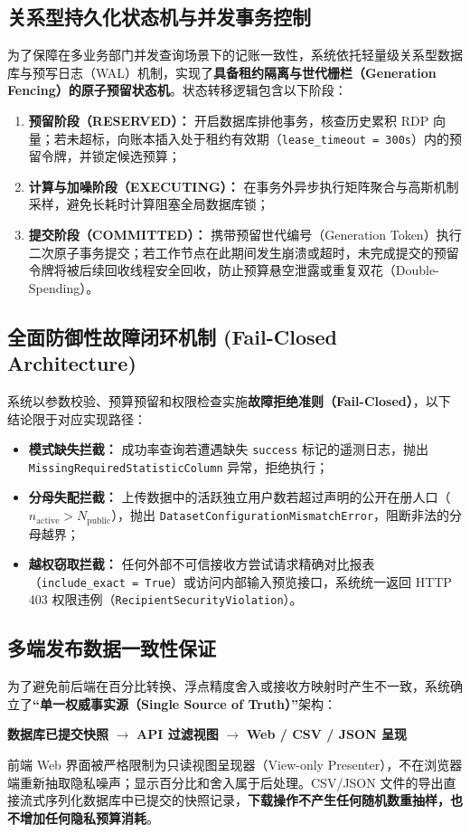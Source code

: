 \subsection{关系型持久化状态机与并发事务控制}
为了保障在多业务部门并发查询场景下的记账一致性，系统依托轻量级关系型数据库与预写日志（WAL）机制，实现了\textbf{具备租约隔离与世代栅栏（Generation Fencing）的原子预留状态机}。状态转移逻辑包含以下阶段：
\begin{enumerate}[label=(\alph*), leftmargin=2.5em]
  \item \textbf{预留阶段（RESERVED）：} 开启数据库排他事务，核查历史累积 RDP 向量；若未超标，向账本插入处于租约有效期（\texttt{lease\_timeout = 300s}）内的预留令牌，并锁定候选预算；
  \item \textbf{计算与加噪阶段（EXECUTING）：} 在事务外异步执行矩阵聚合与高斯机制采样，避免长耗时计算阻塞全局数据库锁；
  \item \textbf{提交阶段（COMMITTED）：} 携带预留世代编号（Generation Token）执行二次原子事务提交；若工作节点在此期间发生崩溃或超时，未完成提交的预留令牌将被后续回收线程安全回收，防止预算悬空泄露或重复双花（Double-Spending）。
\end{enumerate}

\subsection{全面防御性故障闭环机制 (Fail-Closed Architecture)}
系统以参数校验、预算预留和权限检查实施\textbf{故障拒绝准则（Fail-Closed）}，以下结论限于对应实现路径：
\begin{itemize}[leftmargin=2em]
  \item \textbf{模式缺失拦截：} 成功率查询若遭遇缺失 \texttt{success} 标记的遥测日志，抛出 \texttt{MissingRequired}\allowbreak\texttt{StatisticColumn} 异常，拒绝执行；
  \item \textbf{分母失配拦截：} 上传数据中的活跃独立用户数若超过声明的公开在册人口（$n_{\text{active}} > N_{\text{public}}$），抛出 \texttt{DatasetConfiguration}\allowbreak\texttt{MismatchError}，阻断非法的分母越界；
  \item \textbf{越权窃取拦截：} 任何外部不可信接收方尝试请求精确对比报表（\texttt{include\_exact = True}）或访问内部输入预览接口，系统统一返回 HTTP 403 权限违例（\texttt{RecipientSecurity}\allowbreak\texttt{Violation}）。
\end{itemize}

\subsection{多端发布数据一致性保证}
为了避免前后端在百分比转换、浮点精度舍入或接收方映射时产生不一致，系统确立了\textbf{“单一权威事实源（Single Source of Truth）”}架构：
\begin{center}
  \textbf{数据库已提交快照} $\longrightarrow$ \textbf{API 过滤视图} $\longrightarrow$ \textbf{Web / CSV / JSON 呈现}
\end{center}
前端 Web 界面被严格限制为只读视图呈现器（View-only Presenter），不在浏览器端重新抽取隐私噪声；显示百分比和舍入属于后处理。CSV/JSON 文件的导出直接流式序列化数据库中已提交的快照记录，\textbf{下载操作不产生任何随机数重抽样，也不增加任何隐私预算消耗}。
